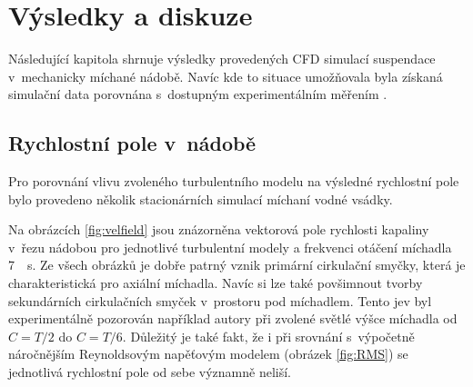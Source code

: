 \chapter{Výsledky a diskuze}
Následující kapitola shrnuje výsledky provedených CFD simulací suspendace v~mechanicky míchané nádobě. Navíc kde to situace umožňovala byla získaná simulační data porovnána s~dostupným experimentálním měřením \citep{pav11}.

\section{Rychlostní pole v~nádobě}
Pro porovnání vlivu zvoleného turbulentního modelu na výsledné rychlostní pole bylo provedeno několik stacionárních simulací míchaní vodné vsádky. 

Na obrázcích \ref{fig:velfield} jsou znázorněna vektorová pole rychlosti kapaliny v~řezu nádobou pro jednotlivé turbulentní modely a frekvenci otáčení míchadla \SI{7}{\per\second}. Ze všech obrázků je dobře patrný vznik primární cirkulační smyčky, která je charakteristická pro axiální míchadla. Navíc si lze také povšimnout tvorby sekundárních cirkulačních smyček v~prostoru pod míchadlem. Tento jev byl experimentálně pozorován například autory \citet{hos10} při zvolené světlé výšce míchadla od $C=T/2$ do $C=T/6$. Důležitý je také fakt, že i při srovnání s~výpočetně náročnějším Reynoldsovým napěťovým modelem (obrázek \ref{fig:RMS}) se jednotlivá rychlostní pole od sebe významně neliší.

